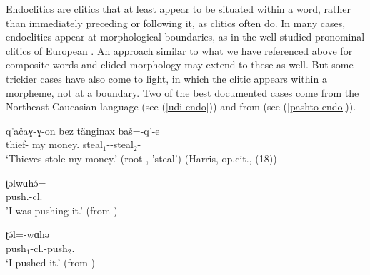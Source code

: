 \documentclass[output=paper
	        ,collection
	        ,collectionchapter
 	        ,biblatex
                ,babelshorthands
                ,newtxmath
                ,draftmode
                ,colorlinks, citecolor=brown
]{langscibook}
\begin{document}
Endoclitics are clitics that at least appear to be situated within a word, rather than immediately
preceding or following it, as clitics often do.
In many cases, endoclitics appear at morphological boundaries, as in the well-studied pronominal clitics of European   \citep{Crysmann2000a}. An approach similar to what we have referenced above for composite words and elided morphology may extend to these as well. But some trickier cases have also come to light, in which the clitic appears within a morpheme, not at a boundary. Two of the best documented cases come from the Northeast Caucasian language  \citep{Harris2000} (see (\ref{udi-endo})) and from  \citep{Tegey1977,Roberts2000,Dost2007} (see (\ref{pashto-endo})).

\ea
\label{udi-endo}
\gll q'a\v{c}aɣ-ɣ-on bez t\"{a}nginax ba\v{s}=-q'-e \\
     thief- my money. steal$_{1}$--steal$_{2}$- \\
\glt `Thieves stole my money.' (root , 'steal') (Harris, op.cit., (18))
\z

\eal
\label{pashto-endo}
\ex\label{pashto-endo-a}
\gll ʈəlwɑhə́= \\
     push.-cl. \\
\glt 'I was pushing it.' (from \citealt{Tegey1977,Dost2007})

\ex\label{pashto-endo-b}
\gll ʈə́l=-wɑhə \\
     push$_{1}$-cl.-push$_{2}$. \\
\glt `I pushed it.' (from \citealt{Tegey1977,Dost2007})
\zl
\end{document}
